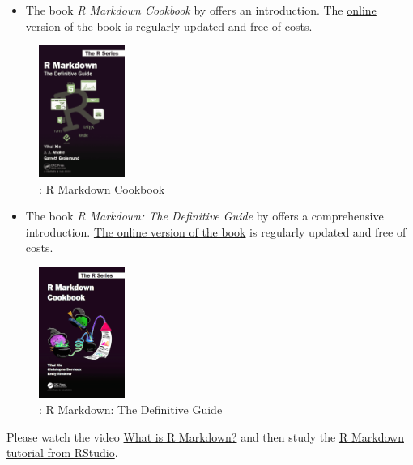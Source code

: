 \documentclass[
  12pt,
  oneside]{book}
\providecommand{\tightlist}{%
  \setlength{\itemsep}{0pt}\setlength{\parskip}{0pt}}
\theoremstyle{definition}
\theoremstyle{definition}
\theoremstyle{definition}
\theoremstyle{definition}
\theoremstyle{remark}
\begin{document}
\begin{itemize}
\tightlist
\item
  The book \emph{R Markdown Cookbook} by \citet{Xie2020R} offers an introduction. The \href{https://bookdown.org/yihui/rmarkdown-cookbook}{online version of the book} is regularly updated and free of costs.
\end{itemize}

\begin{figure}
\centering
\includegraphics[width=0.25\textwidth,height=\textheight]{fig/rmarkdownbook.png}
\caption{\citet{Xie2020R}: R Markdown Cookbook}
\end{figure}

\begin{itemize}
\tightlist
\item
  The book \emph{R Markdown: The Definitive Guide} by \citet{Xie2018R} offers a comprehensive introduction. \href{https://bookdown.org/yihui/rmarkdown}{The online version of the book} is regularly updated and free of costs.
\end{itemize}

\begin{figure}
\centering
\includegraphics[width=0.25\textwidth,height=\textheight]{fig/rmcb.png}
\caption{\citet{Xie2018R}: R Markdown: The Definitive Guide}
\end{figure}

Please watch the video \href{https://vimeo.com/178485416}{What is R Markdown?} and then study the \href{https://rmarkdown.rstudio.com/lesson-1.html}{R Markdown tutorial from RStudio}.
\end{document}
